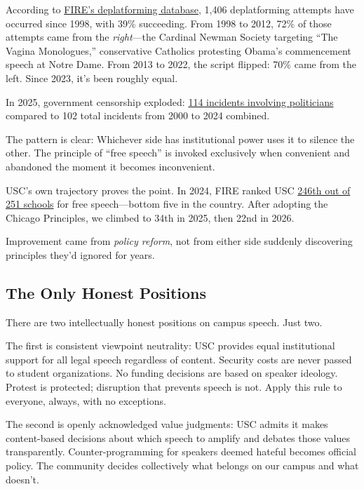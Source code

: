 \documentclass[11pt]{article}
\begin{document}
According to \href{https://www.thefire.org/research-learn/campus-deplatforming-database}{FIRE's deplatforming database}, 1,406 deplatforming attempts have occurred since 1998, with 39\% succeeding. From 1998 to 2012, 72\% of those attempts came from the \textit{right}---the Cardinal Newman Society targeting ``The Vagina Monologues,'' conservative Catholics protesting Obama's commencement speech at Notre Dame. From 2013 to 2022, the script flipped: 70\% came from the left. Since 2023, it's been roughly equal.

In 2025, government censorship exploded: \href{https://www.thefire.org/news/worst-both-worlds-campus-free-speech}{114 incidents involving politicians} compared to 102 total incidents from 2000 to 2024 combined.

The pattern is clear: Whichever side has institutional power uses it to silence the other. The principle of ``free speech'' is invoked exclusively when convenient and abandoned the moment it becomes inconvenient.

USC's own trajectory proves the point. In 2024, FIRE ranked USC \href{https://thefire.org/sites/default/files/2024-09/2025\%20CFSR\%20Spotlight\%20-\%20U\%20of\%20South\%20Carolina.pdf}{246th out of 251 schools} for free speech---bottom five in the country. After adopting the Chicago Principles, we climbed to 34th in 2025, then 22nd in 2026.

Improvement came from \textit{policy reform}, not from either side suddenly discovering principles they'd ignored for years.

\subsection{The Only Honest Positions}

There are two intellectually honest positions on campus speech. Just two.

The first is consistent viewpoint neutrality: USC provides equal institutional support for all legal speech regardless of content. Security costs are never passed to student organizations. No funding decisions are based on speaker ideology. Protest is protected; disruption that prevents speech is not. Apply this rule to everyone, always, with no exceptions.

The second is openly acknowledged value judgments: USC admits it makes content-based decisions about which speech to amplify and debates those values transparently. Counter-programming for speakers deemed hateful becomes official policy. The community decides collectively what belongs on our campus and what doesn't.
\end{document}

